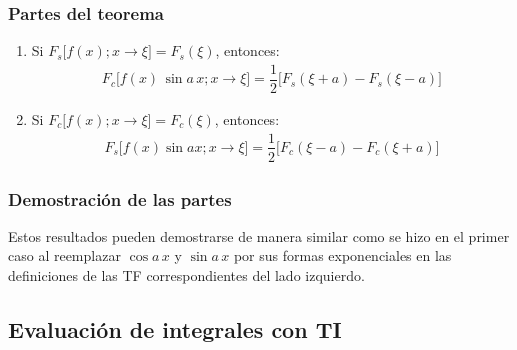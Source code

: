 \begin{frame}
\frametitle{Partes del teorema}
\begin{enumerate}[<+->]
\conti
\item Si $F_{s} \big[ f (x); x \to \xi \big] = F_{s} (\xi)$, entonces:
\begin{align*}
F_{c} \big[ f (x) \, \sin a \, x; x \to \xi \big] = \dfrac{1}{2} \big[ F_{s} (\xi {+}  a) {-} F_{s} (\xi {-} a) \big]
\end{align*}
\item Si $F_{c} \big[f (x); x \to \xi \big] = F_{c} (\xi)$, entonces:
\begin{align*}
F_{s} \big[f (x) \sin a x; x \to \xi \big] {=} \dfrac{1}{2} \big[ F_{c} (\xi {-}  a) {-} F_{c} (\xi {+} a) \big]
\end{align*}
\end{enumerate}
\end{frame}
\begin{frame}
\frametitle{Demostración de las partes}
Estos resultados pueden demostrarse de manera similar como se hizo en el primer caso al reemplazar $\cos a \, x$ y $\sin a \, x$ por sus formas exponenciales en las definiciones de las TF correspondientes del lado izquierdo.
\end{frame}

\subsection{Evaluación de integrales con TI}

